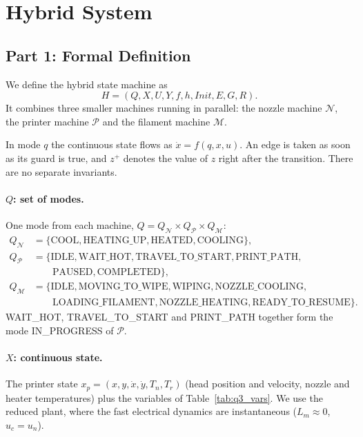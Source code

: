 \section{Hybrid System}
\label{sec:hybrid_system}

\subsection{Part 1: Formal Definition}
\label{sec:q3_part1}

We define the hybrid state machine as
\[
    H = (Q, X, U, Y, f, h, \mathit{Init}, E, G, R).
\]
It combines three smaller machines running in parallel: the nozzle machine $\mathcal{N}$, the printer machine $\mathcal{P}$ and the filament machine $\mathcal{M}$.

In mode $q$ the continuous state flows as $\dot{x} = f(q, x, u)$. An edge is taken as soon as its guard is true, and $z^{+}$ denotes the value of $z$ right after the transition. There are no separate invariants.

\paragraph{\texorpdfstring{$Q$}{Q}: set of modes.} One mode from each machine, $Q = Q_{\mathcal{N}} \times Q_{\mathcal{P}} \times Q_{\mathcal{M}}$:
\begin{align*}
    Q_{\mathcal{N}} &= \{\text{COOL}, \text{HEATING\_UP}, \text{HEATED}, \text{COOLING}\}, \\
    Q_{\mathcal{P}} &= \{\text{IDLE}, \text{WAIT\_HOT}, \text{TRAVEL\_TO\_START}, \text{PRINT\_PATH}, \\
    &\qquad \text{PAUSED}, \text{COMPLETED}\}, \\
    Q_{\mathcal{M}} &= \{\text{IDLE}, \text{MOVING\_TO\_WIPE}, \text{WIPING}, \text{NOZZLE\_COOLING}, \\
    &\qquad \text{LOADING\_FILAMENT}, \text{NOZZLE\_HEATING}, \text{READY\_TO\_RESUME}\}.
\end{align*}
WAIT\_HOT, TRAVEL\_TO\_START and PRINT\_PATH together form the mode IN\_PROGRESS of $\mathcal{P}$.

\paragraph{\texorpdfstring{$X$}{X}: continuous state.} The printer state $x_p = (x, y, \dot{x}, \dot{y}, T_n, T_r)$ (head position and velocity, nozzle and heater temperatures) plus the variables of Table~\ref{tab:q3_vars}. We use the reduced plant, where the fast electrical dynamics are instantaneous ($L_m \approx 0$, $u_c = u_n$).

